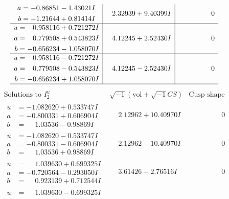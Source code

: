 \documentclass[1p]{elsarticle_modified}
\theoremstyle{definition}
\newcommand{\I}{\sqrt{-1}}
\begin{document}
$$\begin{array}{c|c|c}
\begin{aligned}
a &= -0.86851 - 1.43021 I \\
b &= -1.21644 + 0.81414 I\end{aligned}
 & \phantom{-}2.32939 + 9.40399 I & \phantom{-0.000000 } 0 \\ \hline\begin{aligned}
u &= \phantom{-}0.958116 + 0.721272 I \\
a &= \phantom{-}0.779508 + 0.543823 I \\
b &= -0.656234 - 1.058070 I\end{aligned}
 & \phantom{-}4.12245 + 2.52430 I & \phantom{-0.000000 } 0 \\ \hline\begin{aligned}
u &= \phantom{-}0.958116 - 0.721272 I \\
a &= \phantom{-}0.779508 - 0.543823 I \\
b &= -0.656234 + 1.058070 I\end{aligned}
 & \phantom{-}4.12245 - 2.52430 I & \phantom{-0.000000 } 0\\
 \hline 
 \end{array}$$\newpage$$\begin{array}{c|c|c}  
\text{Solutions to }I^u_{2}& \I (\text{vol} + \sqrt{-1}CS) & \text{Cusp shape}\\
 \hline 
\begin{aligned}
u &= -1.082620 + 0.533747 I \\
a &= -0.800331 + 0.606904 I \\
b &= \phantom{-}1.03536 - 0.98869 I\end{aligned}
 & \phantom{-}2.12962 + 10.40970 I & \phantom{-0.000000 } 0 \\ \hline\begin{aligned}
u &= -1.082620 - 0.533747 I \\
a &= -0.800331 - 0.606904 I \\
b &= \phantom{-}1.03536 + 0.98869 I\end{aligned}
 & \phantom{-}2.12962 - 10.40970 I & \phantom{-0.000000 } 0 \\ \hline\begin{aligned}
u &= \phantom{-}1.039630 + 0.699325 I \\
a &= -0.720564 - 0.293050 I \\
b &= \phantom{-}0.923139 + 0.712544 I\end{aligned}
 & \phantom{-}3.61426 - 2.76516 I & \phantom{-0.000000 } 0 \\ \hline\begin{aligned}
u &= \phantom{-}1.039630 - 0.699325 I \\

\end{aligned}
\end{array}$$
\end{document}
